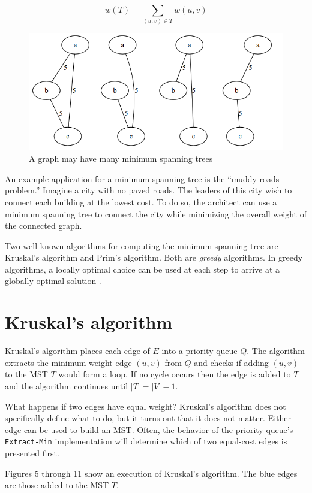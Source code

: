 \documentclass{book}
\begin{document}
\begin{equation}
w(T) = \sum_{(u,v) \in T}{w(u,v)}
\end{equation}

\begin{figure}[ht]
\centering
\includegraphics[width=.75\textwidth]{ch-spann/04}
\caption{A graph may have many minimum spanning trees}
\label{4}
\end{figure}

An example application for a minimum spanning tree is the ``muddy roads problem.'' Imagine a city with no paved roads. The leaders of this city wish to connect each building at the lowest cost. To do so, the architect can use a minimum spanning tree to connect the city while minimizing the overall weight of the connected graph.

Two well-known algorithms for computing the minimum spanning tree are Kruskal's algorithm and Prim's algorithm. Both are \textit{greedy} algorithms. In greedy algorithms, a locally optimal choice can be used at each step to arrive at a globally optimal solution \cite{cormen2001introduction}.

\section{Kruskal's algorithm}

Kruskal's algorithm places each edge of $E$ into a priority queue $Q$. The algorithm extracts the minimum weight edge $(u,v)$ from $Q$ and checks if adding $(u,v)$ to the MST $T$ would form a loop. If no cycle occurs then the edge is added to $T$ and the algorithm continues until $|T|= |V|-1$.

What happens if two edges have equal weight? Kruskal's algorithm does not specifically define what to do, but it turns out that it does not matter. Either edge can be used to build an MST. Often, the behavior of the priority queue's \texttt{Extract-Min} implementation will determine which of two equal-cost edges is presented first.

Figures 5 through 11 show an execution of Kruskal's algorithm. The blue edges are those added to the MST $T$.
\end{document}
